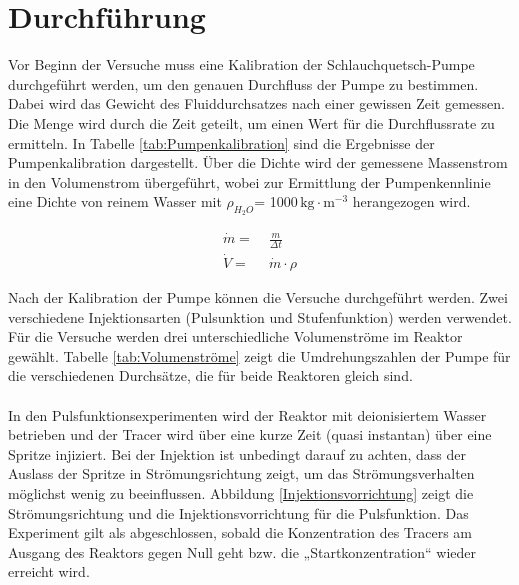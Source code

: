 \documentclass[12pt,liststotoc]{report}
\begin{document}
\chapter{Durchführung}



Vor Beginn der Versuche muss eine Kalibration der Schlauchquetsch-Pumpe durchgeführt werden, um den genauen Durchfluss der Pumpe zu bestimmen. Dabei wird das Gewicht des Fluiddurchsatzes nach einer gewissen Zeit gemessen. Die Menge wird durch die Zeit geteilt, um einen Wert für die Durchflussrate zu ermitteln. In Tabelle \ref{tab:Pumpenkalibration} sind die Ergebnisse der Pumpenkalibration dargestellt. Über die Dichte wird der gemessene Massenstrom in den Volumenstrom übergeführt, wobei zur Ermittlung der Pumpenkennlinie eine Dichte von reinem Wasser mit $\rho_{H_2O}$= 1000\,$\text{kg}\cdot{\text{m}^{-3}}$ herangezogen wird.

\begin{align}
\dot{m} =&\; \frac{m}{\Delta t} \\
\dot{V} =&\; \dot{m} \cdot \rho
\end{align} 

Nach der Kalibration der Pumpe können die Versuche durchgeführt werden. Zwei verschiedene Injektionsarten (Pulsunktion und Stufenfunktion) werden verwendet. Für die Versuche werden drei unterschiedliche Volumenströme im Reaktor gewählt. Tabelle \ref{tab:Volumenströme} zeigt die Umdrehungszahlen der Pumpe für die verschiedenen Durchsätze, die für beide Reaktoren gleich sind.
\\
\\
In den Pulsfunktionsexperimenten wird der Reaktor mit deionisiertem Wasser betrieben und der Tracer wird über eine kurze Zeit (quasi instantan) über eine Spritze injiziert. Bei der Injektion ist unbedingt darauf zu achten, dass der Auslass der Spritze in Strömungsrichtung zeigt, um das Strömungsverhalten möglichst wenig zu beeinflussen. Abbildung \ref{Injektionsvorrichtung} zeigt die Strömungsrichtung und die Injektionsvorrichtung für die Pulsfunktion. Das Experiment gilt als abgeschlossen, sobald die Konzentration des Tracers am Ausgang des Reaktors gegen Null geht bzw. die „Startkonzentration“ wieder erreicht wird.
\end{document}
